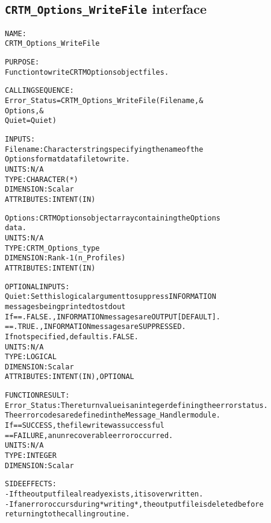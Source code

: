 \subsection{\texttt{CRTM\_Options\_WriteFile} interface}
  \label{sec:CRTM_Options_WriteFile_interface}
  \begin{alltt}
 
  NAME:
        CRTM_Options_WriteFile
 
  PURPOSE:
        Function to write CRTM Options object files.
 
  CALLING SEQUENCE:
        Error_Status = CRTM_Options_WriteFile( Filename     , &
                                               Options      , &
                                               Quiet = Quiet  )
 
  INPUTS:
        Filename:     Character string specifying the name of the
                      Options format data file to write.
                      UNITS:      N/A
                      TYPE:       CHARACTER(*)
                      DIMENSION:  Scalar
                      ATTRIBUTES: INTENT(IN)
 
        Options:      CRTM Options object array containing the Options
                      data.
                      UNITS:      N/A
                      TYPE:       CRTM_Options_type
                      DIMENSION:  Rank-1 (n_Profiles)
                      ATTRIBUTES: INTENT(IN)
 
  OPTIONAL INPUTS:
        Quiet:        Set this logical argument to suppress INFORMATION
                      messages being printed to stdout
                      If == .FALSE., INFORMATION messages are OUTPUT [DEFAULT].
                         == .TRUE.,  INFORMATION messages are SUPPRESSED.
                      If not specified, default is .FALSE.
                      UNITS:      N/A
                      TYPE:       LOGICAL
                      DIMENSION:  Scalar
                      ATTRIBUTES: INTENT(IN), OPTIONAL
 
  FUNCTION RESULT:
        Error_Status: The return value is an integer defining the error status.
                      The error codes are defined in the Message_Handler module.
                      If == SUCCESS, the file write was successful
                         == FAILURE, an unrecoverable error occurred.
                      UNITS:      N/A
                      TYPE:       INTEGER
                      DIMENSION:  Scalar
 
  SIDE EFFECTS:
        - If the output file already exists, it is overwritten.
        - If an error occurs during *writing*, the output file is deleted before
          returning to the calling routine.
 
  \end{alltt}
